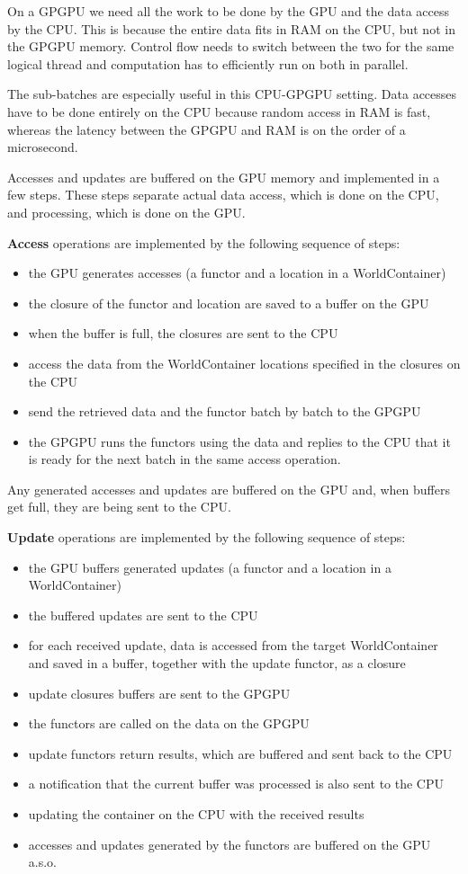 \documentclass{article}
\begin{document}
\begin{enumerate}
On a GPGPU we need all the work to be done by the GPU and the data access by the CPU.
This is because the entire data fits in RAM on the CPU, but not in the GPGPU memory.
Control flow needs to switch between the two for the same logical thread and computation
has to efficiently run on both in parallel.

The sub-batches are especially useful in this CPU-GPGPU setting. Data accesses have to
be done entirely on the CPU because random access in RAM is fast, whereas the latency
between the GPGPU and RAM is on the order of a microsecond.

Accesses and updates are buffered on the GPU memory and implemented in a few steps.
These steps separate actual data access, which is done on the CPU, and processing,
which is done on the GPU. 

{\bf Access} operations are implemented by the following
sequence of steps: 
\begin{itemize}
\item the GPU generates accesses (a functor and a location in a WorldContainer)
\item the closure of the functor and location are saved to a buffer on the GPU
\item when the buffer is full, the closures are sent to the CPU
\item access the data from the WorldContainer locations specified in the closures on the CPU 
\item send the retrieved data and the functor batch by batch to the GPGPU
\item the GPGPU runs the functors using the data and replies to the CPU that it is ready
for the next batch in the same access operation. 
\end{itemize}
Any generated accesses and updates are buffered on the GPU and, 
when buffers get full, they are being sent to the CPU.

{\bf Update} operations are implemented by the following
sequence of steps: 
\begin{itemize}
\item the GPU buffers generated updates (a functor and a location in a WorldContainer)
\item the buffered updates are sent to the CPU
\item for each received update, data is accessed  from the target WorldContainer and 
saved in a buffer, together with the update functor, as a closure
\item  update closures buffers are sent to the GPGPU
\item the functors are called on the data on the GPGPU
\item update functors return results, which are buffered and sent back to the CPU
\item a notification that the current buffer was processed is also sent to the CPU
\item updating the container on the CPU with the received results 
\item accesses and updates generated by the functors are buffered on the GPU a.s.o.
\end{itemize}


\end{enumerate}
\end{document}
